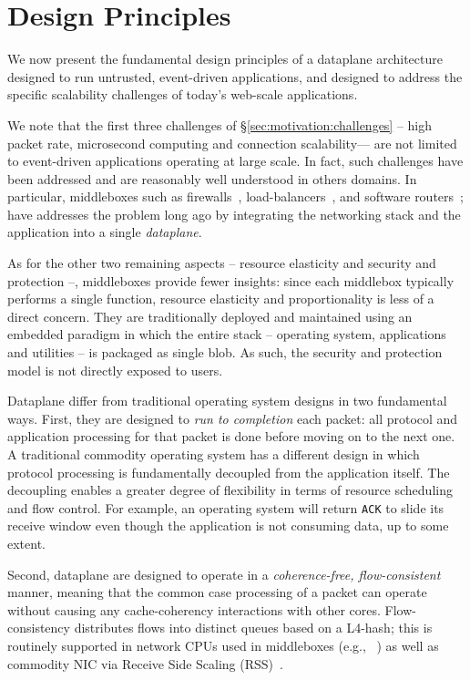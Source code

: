 \section{Design Principles}
\label{sec:design}

We now present the fundamental design principles of a dataplane
architecture designed to run untrusted, event-driven applications, and
designed to address the specific scalability challenges of today's
web-scale applications.

We note that the first three challenges of
\S\ref{sec:motivation:challenges} -- high packet rate, microsecond
computing and connection scalability--- are not limited to
event-driven applications operating at large scale.  In fact, such
challenges have been addressed and are reasonably well understood in
others domains.  In particular, middleboxes such as
firewalls~\cite{missing}, load-balancers~\cite{missing}, and software
routers~\cite{DBLP:journals/tocs/KohlerMCJK00,DBLP:conf/sosp/DobrescuEACFIKMR09};
have addresses the problem long ago by integrating the networking
stack and the application into a single \emph{dataplane}.  

As for the other two remaining aspects -- resource elasticity and
security and protection --, middleboxes provide fewer insights: since
each middlebox typically performs a single function, resource
elasticity and proportionality is less of a direct concern.  They are
traditionally deployed and maintained using an embedded paradigm in
which the entire stack -- operating system, applications and utilities
-- is packaged as single blob.  As such, the security and protection
model is not directly exposed to users.

Dataplane differ from traditional operating system designs in two
fundamental ways. First, they are designed to \emph{run to completion}
each packet: all protocol and application processing for that packet
is done before moving on to the next one.  A traditional commodity
operating system has a different design in which protocol processing
is fundamentally decoupled from the application itself.  The
decoupling enables a greater degree of flexibility in terms of resource
scheduling and flow control.  For example, an operating system will
return \texttt{ACK} to slide its receive window even though the
application is not consuming data, up to some extent.

Second, dataplane are designed to operate in a \emph{coherence-free,
  flow-consistent} manner, meaning that the common case processing of
a packet can operate without causing any cache-coherency interactions
with other cores.  Flow-consistency distributes flows into distinct
queues based on a L4-hash; this is routinely supported in network CPUs
used in middleboxes (e.g., ~\cite{cavium-octeon}) as well as commodity
NIC via Receive Side Scaling (RSS)~\cite{missing}.

